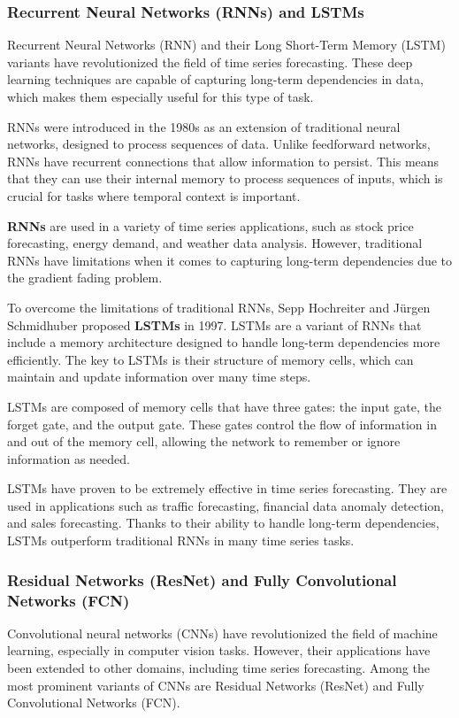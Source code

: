 \subsubsection{Recurrent Neural Networks (RNNs) and LSTMs}
Recurrent Neural Networks (RNN) and their Long Short-Term Memory (LSTM) variants have revolutionized the field of time series forecasting. These deep learning techniques are capable of capturing long-term dependencies in data, which makes them especially useful for this type of task.

RNNs were introduced in the 1980s as an extension of traditional neural networks, designed to process sequences of data. Unlike feedforward networks, RNNs have recurrent connections that allow information to persist. This means that they can use their internal memory to process sequences of inputs, which is crucial for tasks where temporal context is important.
\vspace{10pt}

\textbf{RNNs} are used in a variety of time series applications, such as stock price forecasting, energy demand, and weather data analysis. However, traditional RNNs have limitations when it comes to capturing long-term dependencies due to the gradient fading problem.

To overcome the limitations of traditional RNNs, Sepp Hochreiter and Jürgen Schmidhuber proposed \textbf{LSTMs} in 1997\cite{LSTM}. LSTMs are a variant of RNNs that include a memory architecture designed to handle long-term dependencies more efficiently. The key to LSTMs is their structure of memory cells, which can maintain and update information over many time steps.

LSTMs are composed of memory cells that have three gates: the input gate, the forget gate, and the output gate. These gates control the flow of information in and out of the memory cell, allowing the network to remember or ignore information as needed.

LSTMs have proven to be extremely effective in time series forecasting. They are used in applications such as traffic forecasting, financial data anomaly detection, and sales forecasting. Thanks to their ability to handle long-term dependencies, LSTMs outperform traditional RNNs in many time series tasks.
\vspace{10pt}

\subsubsection{Residual Networks (ResNet) and Fully Convolutional Networks (FCN)}
Convolutional neural networks (CNNs) have revolutionized the field of machine learning, especially in computer vision tasks. However, their applications have been extended to other domains, including time series forecasting. Among the most prominent variants of CNNs are Residual Networks (ResNet) and Fully Convolutional Networks (FCN).

